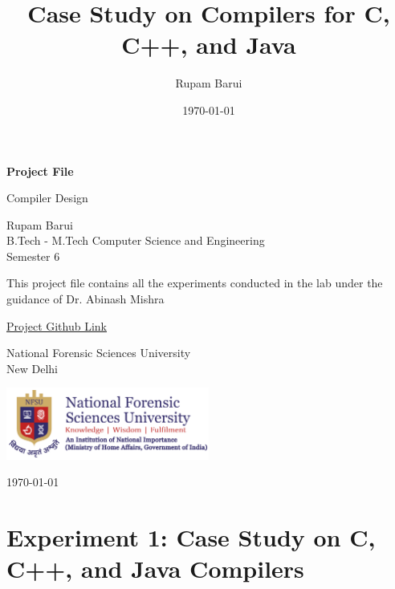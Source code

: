 \documentclass[12pt]{article}
\title{Case Study on Compilers for C, C++, and Java}
\author{Rupam Barui}
\date{\today}
\begin{document}
\begin{titlepage}
    \centering
    \vspace*{1cm}
    \Huge
    \textbf{Project File}
    \vspace{0.5cm}
    
    \LARGE
    Compiler Design 
    
    \vspace{1.5cm}
    
    \Large
    Rupam Barui \\
    \vspace{0.5cm}
    \large
    B.Tech - M.Tech Computer Science and Engineering \\
    \normalsize
    Semester 6
    
    \vspace{1cm}
    
    \normalsize
    This project file contains all the experiments conducted in the lab under the guidance of Dr. Abinash Mishra
    
    \vspace{1cm}
    
    \href{https://github.com/Trident09/Semester-6/tree/main/Compiler%20Design}{Project Github Link}
    
    \vfill
    
    \Large
    National Forensic Sciences University\\
    New Delhi
    
    \vspace{0.8cm}
    
    \includegraphics[width=0.5\textwidth]{nfsu.png}
    
    \Large
    \today
\end{titlepage}

\newpage
\tableofcontents

\newpage

\section*{Experiment 1: Case Study on C, C++, and Java Compilers}
\end{document}
